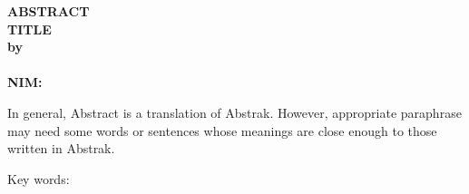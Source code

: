 \clearpage
{}
{}
\begin{center}
\textbf{\large  ABSTRACT}\\[0.5cm]
\textbf{\large TITLE}\\[0.5cm]
\textbf{by}\\
\textbf{\penulis}\\
\textbf{NIM: \nim}\\[2em]
\end{center}

\noindent In general, Abstract is a translation of Abstrak. However, appropriate paraphrase may need some words or sentences whose meanings are close enough to those written in Abstrak.

\noindent Key words: \keywords